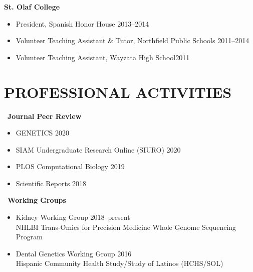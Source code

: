 \documentclass[margin]{res}
\begin{document}
\begin{resume}
			\textbf{St. Olaf College}
			\begin{itemize} \itemsep -2pt
			\item President, Spanish Honor House \hfill 2013--2014
			\item Volunteer Teaching Assistant \& Tutor, Northfield Public Schools \hfill 2011--2014
			\item Volunteer Teaching Assistant, Wayzata High School\hfill 2011 \\
			\end{itemize}
						
\section{PROFESSIONAL ACTIVITIES} 
	\ \textbf{Journal Peer Review} 
	\begin{itemize} \itemsep -2pt 
	\item GENETICS \hfill 2020
	\item SIAM Undergraduate Research Online (SIURO) \hfill 2020
	\item PLOS Computational Biology \hfill 2019
	\item Scientific Reports \hfill 2018
	\end{itemize} %
	
	\ \textbf{Working Groups} 
	\begin{itemize} \itemsep -2pt
	\item Kidney Working Group \hfill 2018--present \\ NHLBI Trans-Omics for Precision Medicine Whole Genome Sequencing Program 
	\item Dental Genetics Working Group \hfill 2016 \\ Hispanic Community Health Study/Study of Latinos (HCHS/SOL)
	\end{itemize}
	

\end{resume}
\end{document}
